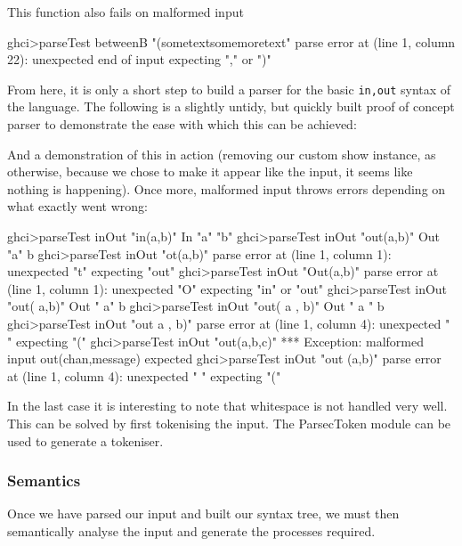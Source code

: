 This function also fails on malformed input

\begin{code}
    ghci>parseTest betweenB "(sometextsomemoretext"
    parse error at (line 1, column 22):
    unexpected end of input
    expecting "," or ")"
\end{code}

From here, it is only a short step to build a parser for the basic \verb!in,out! syntax of the language. The following is a slightly untidy, but quickly built proof of concept parser to demonstrate the ease with which this can be achieved:


And a demonstration of this in action (removing our custom show instance, as otherwise, because we chose to make it appear like the input, it seems like nothing is happening). Once more, malformed input throws errors depending on what exactly went wrong: 
\begin{code}
    ghci>parseTest inOut "in(a,b)"
    In "a" "b"
    ghci>parseTest inOut "out(a,b)"
    Out "a" b
    ghci>parseTest inOut "ot(a,b)"
    parse error at (line 1, column 1):
    unexpected "t"
    expecting "out"
    ghci>parseTest inOut "Out(a,b)"
    parse error at (line 1, column 1):
    unexpected "O"
    expecting "in" or "out"
    ghci>parseTest inOut "out( a,b)"
    Out " a" b
    ghci>parseTest inOut "out( a ,      b)"
    Out " a "       b
    ghci>parseTest inOut "out  a ,      b)"
    parse error at (line 1, column 4):
    unexpected " "
    expecting "("
    ghci>parseTest inOut "out(a,b,c)"
    *** Exception: malformed input out(chan,message) expected
    ghci>parseTest inOut "out (a,b)"
    parse error at (line 1, column 4):
    unexpected " "
    expecting "("
\end{code}

In the last case it is interesting to note that whitespace is not handled very well. This can be solved by first tokenising the input. The ParsecToken module can be used to generate a tokeniser.

\subsubsection{Semantics}

Once we have parsed our input and built our syntax tree, we must then semantically analyse the input and generate the processes required. 

